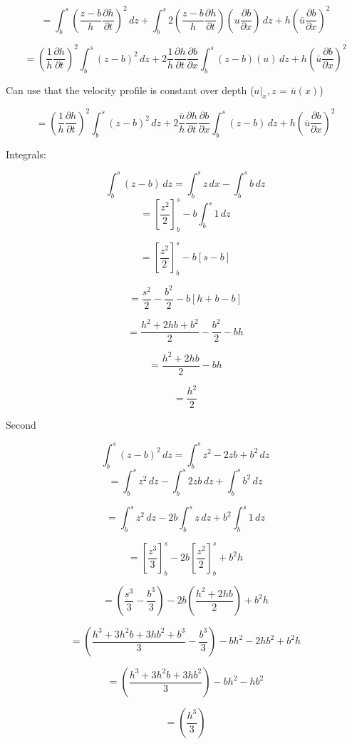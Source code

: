 \documentclass[12pt]{article}
\begin{document}
\[ = \int_b^s  \left(\frac{z - b}{h} \frac{\partial h}{\partial t}\right)^2  \, dz  +  \int_b^s 2\left(\frac{z - b}{h} \frac{\partial h}{\partial t}\right)\left(u \frac{\partial b}{\partial x}\right)  \, dz  + h\left( \bar{u} \frac{\partial b}{\partial x} \right)^2 \]

\[ = \left( \frac{1}{h}\frac{\partial h}{\partial t}\right)^2 \int_b^s  \left(z- b\right)^2  \, dz  +  2\frac{1}{h}\frac{\partial h}{\partial t}\frac{\partial b}{\partial x}\int_b^s \left(z - b\right)\left(u \right)  \, dz  + h\left( \bar{u} \frac{\partial b}{\partial x} \right)^2 \]

Can use that the velocity profile is constant over depth ($u|_x,z$ = $\bar{u}(x)$)

\[ = \left( \frac{1}{h}\frac{\partial h}{\partial t}\right)^2 \int_b^s  \left(z- b\right)^2  \, dz  +  2\frac{\bar{u}}{h}\frac{\partial h}{\partial t}\frac{\partial b}{\partial x}\int_b^s \left(z - b\right)  \, dz  + h\left( \bar{u} \frac{\partial b}{\partial x} \right)^2 \]

Integrals:

\[\int_b^s \left(z - b\right)  \, dz = \int_b^s z\, dx - \int_b^s b \, dz\]
\[= \left[\frac{z^2}{2}\right]_{b}^{s} - b\int_b^s 1 \, dz\]

\[= \left[\frac{z^2}{2}\right]_{b}^{s} - b\left[s - b\right]\]

\[= \frac{s^2}{2} - \frac{b^2}{2} - b\left[h + b - b\right]\]

\[= \frac{h^2 + 2hb + b^2}{2} - \frac{b^2}{2} - bh\]

\[= \frac{h^2 + 2hb}{2} - bh\]

\[= \frac{h^2}{2}\]

Second

\[\int_b^s \left(z - b\right)^2  \, dz = \int_b^s z^2 - 2zb + b^2  \, dz\]
\[= \int_b^s z^2 \, dz - \int_b^s2zb \, dz+ \int_b^s b^2  \, dz\]

\[= \int_b^s z^2 \, dz - 2b\int_b^s z \, dz+ b^2\int_b^s 1  \, dz\]

\[= \left[\frac{z^3}{3}\right]_{b}^{s} - 2b\left[\frac{z^2}{2}\right]_{b}^{s}+ b^2h\]

\[= \left(\frac{s^3}{3} - \frac{b^3}{3}\right) - 2b\left(\frac{h^2 + 2hb}{2}\right)+ b^2h\]

\[= \left(\frac{h^3 + 3 h^2 b + 3 h b^2 + b^3}{3} - \frac{b^3}{3}\right) - bh^2 -  2hb^2+ b^2h\]

\[= \left(\frac{h^3 + 3 h^2 b + 3 h b^2}{3}\right) - bh^2 -  hb^2\]

\[= \left(\frac{h^3}{3}\right)\]
\end{document}
